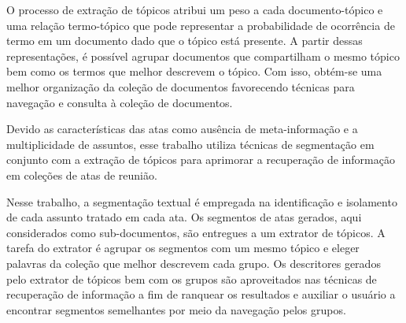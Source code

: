O processo de extração de tópicos atribui um peso a cada documento-tópico e uma relação termo-tópico que pode representar a probabilidade de ocorrência de termo em um documento dado que o tópico está presente. A partir dessas representações, é possível agrupar documentos que compartilham o mesmo tópico bem como os termos que melhor descrevem o tópico. Com isso, obtém-se uma melhor organização da coleção de documentos favorecendo técnicas para navegação e consulta à coleção de documentos. 
















Devido as características das atas como ausência de meta-informação 
e a multiplicidade de assuntos, esse trabalho utiliza técnicas de segmentação em conjunto com a extração de tópicos para aprimorar a recuperação de informação em coleções de atas de reunião. 

Nesse trabalho, a segmentação textual é empregada na identificação e isolamento de cada assunto tratado em cada ata. Os segmentos de atas gerados, aqui considerados como sub-documentos, são entregues a um extrator de tópicos. A tarefa do extrator é agrupar os segmentos com um mesmo tópico e eleger palavras da coleção que melhor descrevem cada grupo. Os descritores gerados pelo extrator de tópicos bem com os grupos são aproveitados nas técnicas de recuperação de informação a fim de ranquear os resultados e auxiliar o usuário a encontrar segmentos semelhantes por meio da navegação pelos grupos.


